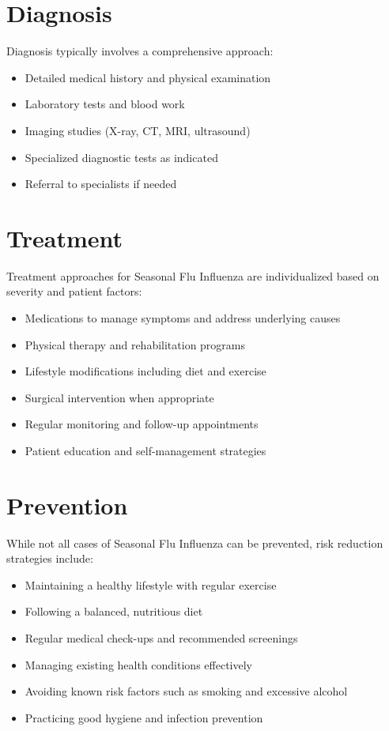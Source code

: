 \section*{Diagnosis}
Diagnosis typically involves a comprehensive approach:

\begin{itemize}
\item Detailed medical history and physical examination
\item Laboratory tests and blood work
\item Imaging studies (X-ray, CT, MRI, ultrasound)
\item Specialized diagnostic tests as indicated
\item Referral to specialists if needed
\end{itemize}

\section*{Treatment}
Treatment approaches for Seasonal Flu Influenza are individualized based on severity and patient factors:

\begin{itemize}
\item Medications to manage symptoms and address underlying causes
\item Physical therapy and rehabilitation programs
\item Lifestyle modifications including diet and exercise
\item Surgical intervention when appropriate
\item Regular monitoring and follow-up appointments
\item Patient education and self-management strategies
\end{itemize}

\section*{Prevention}
While not all cases of Seasonal Flu Influenza can be prevented, risk reduction strategies include:

\begin{itemize}
\item Maintaining a healthy lifestyle with regular exercise
\item Following a balanced, nutritious diet
\item Regular medical check-ups and recommended screenings
\item Managing existing health conditions effectively
\item Avoiding known risk factors such as smoking and excessive alcohol
\item Practicing good hygiene and infection prevention
\end{itemize}


